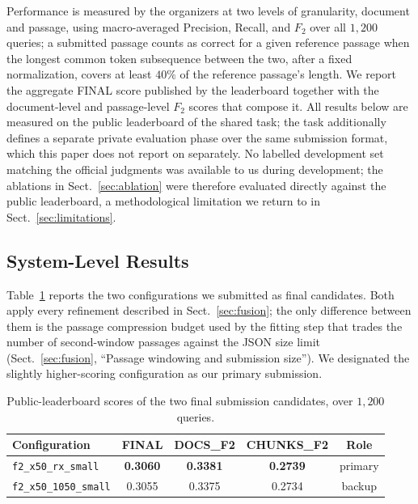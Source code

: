 \documentclass[runningheads]{llncs}
\begin{document}
Performance is measured by the organizers at two levels of granularity,
document and passage, using macro-averaged Precision, Recall, and $F_2$ over
all $1{,}200$ queries; a submitted passage counts as correct for a given
reference passage when the longest common token subsequence between the two,
after a fixed normalization, covers at least $40\%$ of the reference
passage's length. We report the aggregate FINAL score published by the
leaderboard together with the document-level and passage-level $F_2$ scores
that compose it. All results below are measured on the public leaderboard of
the shared task; the task additionally defines a separate private evaluation
phase over the same submission format, which this paper does not report on
separately. No labelled development set matching the official judgments was
available to us during development; the ablations in
Sect.~\ref{sec:ablation} were therefore evaluated directly against the public
leaderboard, a methodological limitation we return to in
Sect.~\ref{sec:limitations}.

\subsection{System-Level Results}
\label{sec:results}

Table~\ref{tab:main} reports the two configurations we submitted as final
candidates. Both apply every refinement described in
Sect.~\ref{sec:fusion}; the only difference between them is the passage
compression budget used by the fitting step that trades the number of
second-window passages against the JSON size limit (Sect.~\ref{sec:fusion},
``Passage windowing and submission size''). We designated the slightly
higher-scoring configuration as our primary submission.

\begin{table}[H]
\centering
\caption{Public-leaderboard scores of the two final submission candidates,
over $1{,}200$ queries.}
\label{tab:main}
\footnotesize
\setlength{\tabcolsep}{4pt}
\begin{tabular}{lcccc}
\hline
Configuration & FINAL & DOCS\_F2 & CHUNKS\_F2 & Role \\
\hline
\texttt{f2\_x50\_rx\_small} & \textbf{0.3060} & \textbf{0.3381} & \textbf{0.2739} & primary \\
\texttt{f2\_x50\_1050\_small} & 0.3055 & 0.3375 & 0.2734 & backup \\
\hline
\end{tabular}
\end{table}
\end{document}
